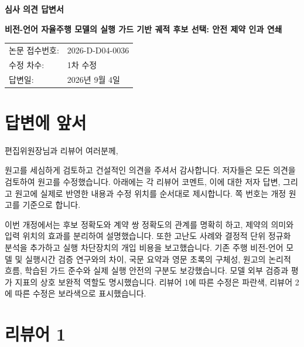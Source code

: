 \documentclass[11pt]{article}
\newcommand{\manuscripttitle}{비전-언어 자율주행 모델의 실행 가드 기반 궤적 후보 선택: 안전 제약 인과 연쇄}
\newcommand{\manuscriptid}{2026-D-D04-0036}
\newcommand{\revisionround}{1차 수정}
\newcommand{\responsedate}{2026년 9월 4일}
\begin{document}
\begin{center}
  {\LARGE\bfseries 심사 의견 답변서\par}
  \vspace{1em}
  {\large\bfseries \manuscripttitle\par}
\end{center}

\vspace{0.8em}
\begin{tabular}{@{}ll@{}}
논문 접수번호: & \manuscriptid \\
수정 차수: & \revisionround \\
답변일: & \responsedate
\end{tabular}

\section*{답변에 앞서}

편집위원장님과 리뷰어 여러분께,

원고를 세심하게 검토하고 건설적인 의견을 주셔서 감사합니다. 저자들은 모든 의견을
검토하여 원고를 수정했습니다. 아래에는 각 리뷰어 코멘트, 이에 대한 저자 답변,
그리고 원고에 실제로 반영한 내용과 수정 위치를 순서대로 제시합니다. 쪽 번호는
개정 원고를 기준으로 합니다.

이번 개정에서는 후보 정확도와 계약 쌍 정확도의 관계를 명확히 하고, 제약의 의미와
입력 위치의 효과를 분리하여 설명했습니다. 또한 고난도 사례와 결정적 단위 정규화
분석을 추가하고 실행 차단장치의 개입 비용을 보고했습니다. 기존 주행 비전-언어
모델 및 실행시간 검증 연구와의 차이, 국문 요약과 영문 초록의 구체성, 원고의 논리적
흐름, 학습된 가드 준수와 실제 실행 안전의 구분도 보강했습니다. 모델 외부 검증과
평가 지표의 상호 보완적 역할도 명시했습니다. 리뷰어 1에 따른 수정은 파란색,
리뷰어 2에 따른 수정은 보라색으로 표시했습니다.

\section*{리뷰어 1}
\end{document}
